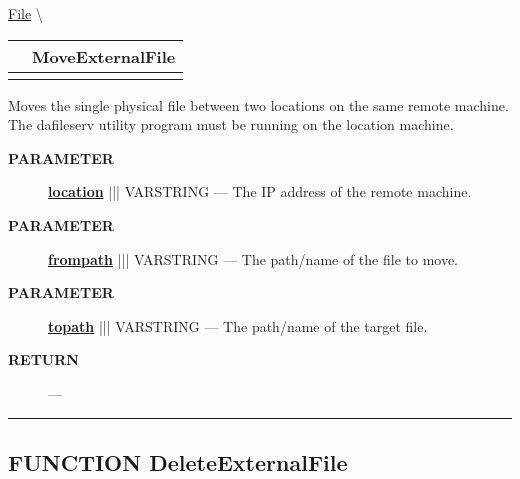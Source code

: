 \hypertarget{ecldoc:file.moveexternalfile}{}
\hspace{0pt} \hyperlink{ecldoc:File}{File} \textbackslash 

{\renewcommand{\arraystretch}{1.5}
\begin{tabularx}{\textwidth}{|>{\raggedright\arraybackslash}l|X|}
\hline
\hspace{0pt}\mytexttt{\color{red} } & \textbf{MoveExternalFile} \\
\hline
\multicolumn{2}{|>{\raggedright\arraybackslash}X|}{\hspace{0pt}\mytexttt{\color{param} (varstring location, varstring frompath, varstring topath)}} \\
\hline
\end{tabularx}
}

\par





Moves the single physical file between two locations on the same remote machine. The dafileserv utility program must be running on the location machine.






\par
\begin{description}
\item [\colorbox{tagtype}{\color{white} \textbf{\textsf{PARAMETER}}}] \textbf{\underline{location}} ||| VARSTRING --- The IP address of the remote machine.
\item [\colorbox{tagtype}{\color{white} \textbf{\textsf{PARAMETER}}}] \textbf{\underline{frompath}} ||| VARSTRING --- The path/name of the file to move.
\item [\colorbox{tagtype}{\color{white} \textbf{\textsf{PARAMETER}}}] \textbf{\underline{topath}} ||| VARSTRING --- The path/name of the target file.
\end{description}







\par
\begin{description}
\item [\colorbox{tagtype}{\color{white} \textbf{\textsf{RETURN}}}] \textbf{} --- 
\end{description}




\rule{\linewidth}{0.5pt}
\subsection*{\textsf{\colorbox{headtoc}{\color{white} FUNCTION}
DeleteExternalFile}}

